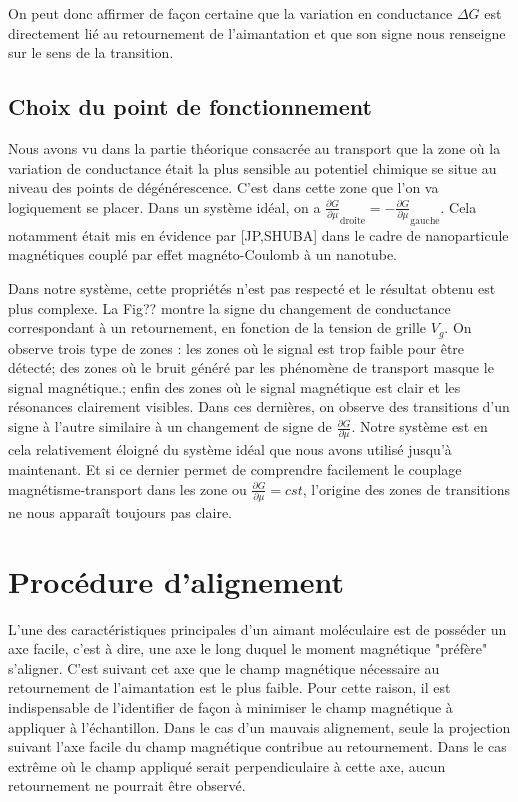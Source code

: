 On peut donc affirmer de façon certaine que la variation en conductance $\Delta G$ est directement lié au retournement de l'aimantation et que son signe nous renseigne sur le sens de la transition.

\subsection{Choix du point de fonctionnement}
Nous avons vu dans la partie théorique consacrée au transport que la zone où la variation de conductance était la plus sensible au potentiel chimique se situe au niveau des points de dégénérescence. C'est dans cette zone que l'on va logiquement se placer. Dans un système idéal, on a $\frac{\partial G}{\partial \mu}_{\text{droite}} = -\frac{\partial G}{\partial \mu}_{\text{gauche}} $. Cela notamment était mis en évidence par [JP,SHUBA] dans le cadre de nanoparticule magnétiques couplé par effet magnéto-Coulomb à un nanotube.

Dans notre système, cette propriétés n'est pas respecté et le résultat obtenu est plus complexe. La Fig?? montre la signe du changement de conductance correspondant à un retournement, en fonction de la tension de grille $V_g$. On observe trois type de zones : les zones où le signal est trop faible pour être détecté; des zones où le bruit généré par les phénomène de transport masque le signal magnétique.; enfin des zones où le signal magnétique est clair et les résonances clairement visibles. Dans ces dernières, on observe des transitions d'un signe à l'autre similaire à un changement de signe de $\frac{\partial G}{\partial \mu}$. Notre système est en cela relativement éloigné du système idéal que nous avons utilisé jusqu'à maintenant. Et si ce dernier permet de comprendre facilement le couplage magnétisme-transport dans les zone ou $\frac{\partial G}{\partial \mu} = cst$, l'origine des zones de transitions ne nous apparaît toujours pas claire.

\section{Procédure d'alignement}
L'une des caractéristiques principales d'un aimant moléculaire est de posséder un axe facile, c'est à dire, une axe le long duquel le moment magnétique "préfère" s'aligner. C'est suivant cet axe que le champ magnétique nécessaire au retournement de l'aimantation est le plus faible. Pour cette raison, il est indispensable de l'identifier de façon à minimiser le champ magnétique à appliquer à l'échantillon. Dans le cas d'un mauvais alignement, seule la projection suivant l'axe facile du champ magnétique contribue au retournement. Dans le cas extrême où le champ appliqué serait perpendiculaire à cette axe, aucun retournement ne pourrait être observé.

